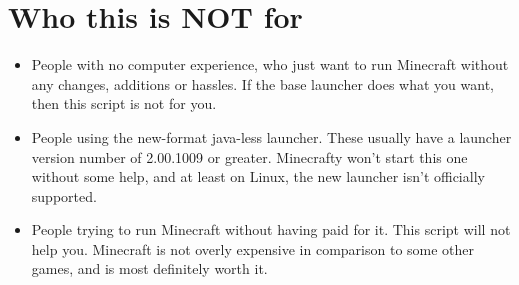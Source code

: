 \documentclass[10pt,a4paper]{book}
\begin{document}
\section*{Who this is NOT for}
\begin{itemize}
\item People with no computer experience, who just want to run Minecraft without
  any changes, additions or hassles. If the base launcher does what you want, then
  this script is not for you.
\item People using the new-format java-less launcher. These usually have a
 launcher version number of 2.00.1009 or greater. Minecrafty won't start this one without
  some help, and at least on Linux, the new launcher isn't officially supported.
\item People trying to run Minecraft without having paid for it. This script
  will not help you. Minecraft is not overly expensive in comparison to some
  other games, and is most definitely worth it.
\end{itemize}
\end{document}
